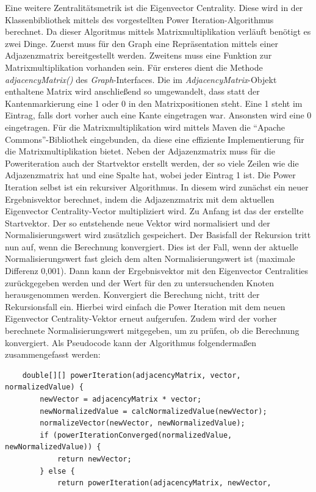 \documentclass[a4paper,12pt,ngerman,chapterprefix=false,listof=totoc,bibliography=totoc]{scrreprt}
\begin{document}
{{{Eine weitere Zentralitätsmetrik ist die Eigenvector Centrality. Diese wird in der Klassenbibliothek mittels des vorgestellten Power Iteration-Algorithmus berechnet. Da dieser Algoritmus mittels Matrixmultiplikation verläuft benötigt es zwei Dinge. Zuerst muss für den Graph eine Repräsentation mittels einer Adjazenzmatrix bereitgestellt werden. Zweitens muss eine Funktion zur Matrixmultiplikation vorhanden sein. Für ersteres dient die Methode \textit{adjacencyMatrix()} des \textit{Graph}-Interfaces. Die im \textit{AdjacencyMatrix}-Objekt enthaltene Matrix wird anschließend so umgewandelt, dass statt der Kantenmarkierung eine 1 oder 0 in den Matrixpositionen steht. Eine 1 steht im Eintrag, falls dort vorher auch eine Kante eingetragen war. Ansonsten wird eine 0 eingetragen. Für die Matrixmultiplikation wird mittels Maven die "`Apache Commons"'-Bibliothek eingebunden, da diese eine effiziente Implementierung für die Matrixmultiplikation bietet. Neben der Adjazenzmatrix muss für die Poweriteration auch der Startvektor erstellt werden, der so viele Zeilen wie die Adjazenzmatrix hat und eine Spalte hat, wobei jeder Eintrag 1 ist. Die Power Iteration selbst ist ein rekursiver Algorithmus. In diesem wird zunächst ein neuer Ergebnisvektor berechnet, indem die Adjazenzmatrix mit dem aktuellen Eigenvector Centrality-Vector multipliziert wird. Zu Anfang ist das der erstellte Startvektor. Der so entstehende neue Vektor wird normalisiert und der Normalisierungswert wird zusätzlich gespeichert. Der Basisfall der Rekursion tritt nun auf, wenn die Berechnung konvergiert. Dies ist der Fall, wenn der aktuelle Normalisierungswert fast gleich dem alten Normalisierungswert ist (maximale Differenz 0,001). Dann kann der Ergebnisvektor mit den Eigenvector Centralities zurückgegeben werden und der Wert für den zu untersuchenden Knoten herausgenommen werden. Konvergiert die Berechung nicht, tritt der Rekursionsfall ein. Hierbei wird einfach die Power Iteration mit dem neuen Eigenvector Centrality-Vektor erneut aufgerufen. Zudem wird der vorher berechnete Normalisierungswert mitgegeben, um zu prüfen, ob die Berechnung konvergiert. Als Pseudocode kann der Algorithmus folgendermaßen zusammengefasst werden:
\begin{lstlisting}
	double[][] powerIteration(adjacencyMatrix, vector, normalizedValue) {
		newVector = adjacencyMatrix * vector;
		newNormalizedValue = calcNormalizedValue(newVector);
		normalizeVector(newVector, newNormalizedValue);
		if (powerIterationConverged(normalizedValue, newNormalizedValue)) {
			return newVector;
		} else {
			return powerIteration(adjacencyMatrix, newVector,

\end{lstlisting}}}}
\end{document}
